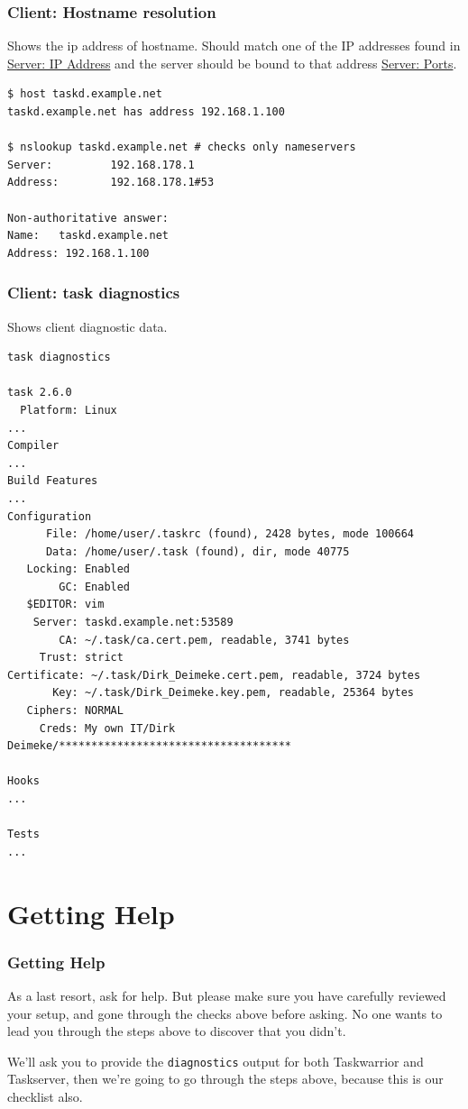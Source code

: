 \documentclass[t,handout]{beamer}
\begin{document}
\begin{frame}[fragile]\frametitle{Client: Hostname resolution}\label{C3}
    \vfill
    Shows the ip address of hostname. Should match one of the IP addresses found in \hyperlink{C1}{Server: IP Address} and the server should be bound to that address \hyperlink{S2}{Server: Ports}.
    \begin{lstlisting}
$ host taskd.example.net
taskd.example.net has address 192.168.1.100

$ nslookup taskd.example.net # checks only nameservers
Server:         192.168.178.1
Address:        192.168.178.1#53

Non-authoritative answer:
Name:   taskd.example.net
Address: 192.168.1.100\end{lstlisting}
    \vfill
\end{frame}

\begin{frame}[fragile]\frametitle{Client: task diagnostics}\label{C4}
    \vfill
        Shows client diagnostic data.

    \begin{lstlisting}
task diagnostics

task 2.6.0
  Platform: Linux
...
Compiler
...
Build Features
...
Configuration
      File: /home/user/.taskrc (found), 2428 bytes, mode 100664
      Data: /home/user/.task (found), dir, mode 40775
   Locking: Enabled
        GC: Enabled
   $EDITOR: vim
    Server: taskd.example.net:53589
        CA: ~/.task/ca.cert.pem, readable, 3741 bytes
     Trust: strict
Certificate: ~/.task/Dirk_Deimeke.cert.pem, readable, 3724 bytes
       Key: ~/.task/Dirk_Deimeke.key.pem, readable, 25364 bytes
   Ciphers: NORMAL
     Creds: My own IT/Dirk Deimeke/************************************

Hooks
...

Tests
...\end{lstlisting}
    \vfill
\end{frame}

\section{Getting Help}

\begin{frame}[fragile]\frametitle{Getting Help}
    As a last resort, ask for help. But please make sure you have carefully reviewed your setup, and gone through the checks above before asking. No one wants to lead you through the steps above to discover that you didn't.

    We'll ask you to provide the \verb+diagnostics+ output for both Taskwarrior and Taskserver, then we're going to go through the steps above, because this is our checklist also.
\end{frame}
\end{document}

